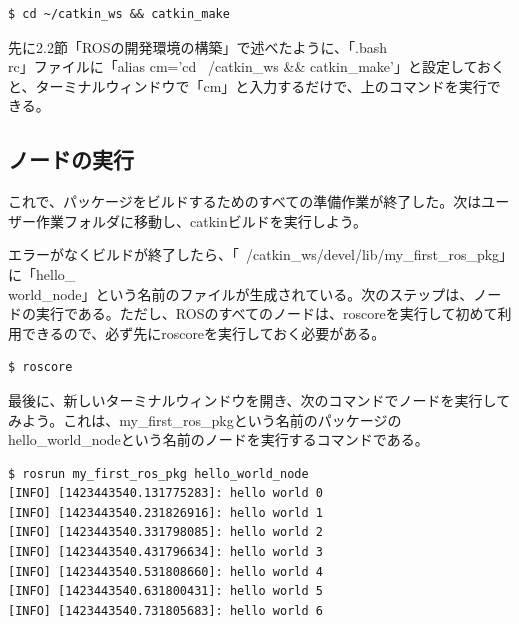 \begin{lstlisting}[language=ROS]
$ cd ~/catkin_ws && catkin_make
\end{lstlisting}

\begin{exercise}[短縮コマンド]
先に2.2節「ROSの開発環境の構築」で述べたように、「.bash\\rc」ファイルに「alias cm='cd ~/catkin\_ws \&\& catkin\_make'」と設定しておくと、ターミナルウィンドウで「cm」と入力するだけで、上のコマンドを実行できる。
\end{exercise}

\subsection{ノードの実行}
これで、パッケージをビルドするためのすべての準備作業が終了した。次はユーザー作業フォルダに移動し、catkinビルドを実行しよう。

エラーがなくビルドが終了したら、「~/catkin\_ws/devel/lib/my\_first\_ros\_pkg」に「hello\_\\world\_node」という名前のファイルが生成されている。次のステップは、ノードの実行である。ただし、ROSのすべてのノードは、roscoreを実行して初めて利用できるので、必ず先にroscoreを実行しておく必要がある。

\begin{lstlisting}[language=ROS]
$ roscore
\end{lstlisting}

最後に、新しいターミナルウィンドウを開き、次のコマンドでノードを実行してみよう。これは、my\_first\_ros\_pkgという名前のパッケージのhello\_world\_nodeという名前のノードを実行するコマンドである。

\begin{lstlisting}[language=ROS]
$ rosrun my_first_ros_pkg hello_world_node
[INFO] [1423443540.131775283]: hello world 0
[INFO] [1423443540.231826916]: hello world 1
[INFO] [1423443540.331798085]: hello world 2
[INFO] [1423443540.431796634]: hello world 3
[INFO] [1423443540.531808660]: hello world 4
[INFO] [1423443540.631800431]: hello world 5
[INFO] [1423443540.731805683]: hello world 6
\end{lstlisting}

